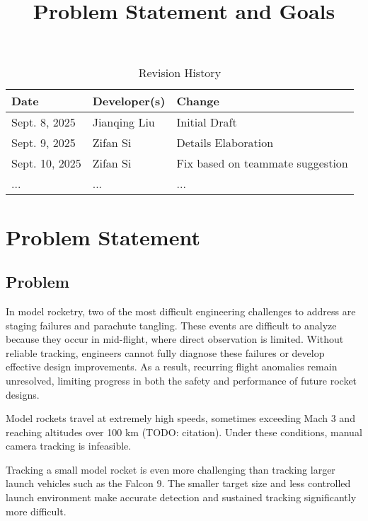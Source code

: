 \documentclass{article}
\title{Problem Statement and Goals\\\progname}
\author{\authname}
\date{}
\begin{document}
\maketitle

\begin{table}[hp]
\caption{Revision History} \label{TblRevisionHistory}
\begin{tabularx}{\textwidth}{llX}
\toprule
\textbf{Date} & \textbf{Developer(s)} & \textbf{Change}\\
\midrule
Sept. 8, 2025 & Jianqing Liu & Initial Draft\\
Sept. 9, 2025 & Zifan Si & Details Elaboration\\
Sept. 10, 2025 & Zifan Si & Fix based on teammate suggestion\\
... & ... & ...\\
\bottomrule
\end{tabularx}
\end{table}

\section{Problem Statement}



\subsection{Problem}

In model rocketry, two of the most difficult engineering challenges to address
are staging failures and parachute tangling. These events are difficult to
analyze because they occur in mid-flight, where direct observation is limited.
Without reliable tracking, engineers cannot fully diagnose these failures or
develop effective design improvements. As a result, recurring flight anomalies
remain unresolved, limiting progress in both the safety and performance of
future rocket designs.

Model rockets travel at extremely high speeds, sometimes exceeding Mach 3 and
reaching altitudes over 100 km (TODO: citation). Under these conditions, manual
camera tracking is infeasible.

Tracking a small model rocket is even more challenging than tracking larger
launch vehicles such as the Falcon 9. The smaller target size and less
controlled launch environment make accurate detection and sustained tracking
significantly more difficult.
\end{document}

